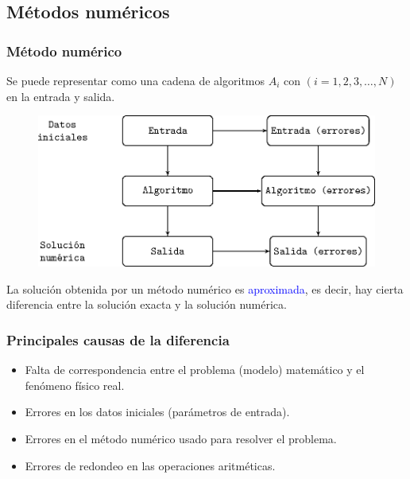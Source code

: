 \subsection{Métodos numéricos}
\begin{frame}
\frametitle{Método numérico}
Se puede representar como una cadena de algoritmos $A_{i}$ con $(i = 1, 2, 3, \ldots , N)$ en la entrada y salida.
\begin{figure}
\centering
\includegraphics[scale=1]{dibujometodonum.eps} 
\end{figure}
\end{frame}
\begin{frame}
La solución obtenida por un método numérico es \textcolor{blue}{aproximada}, es decir, hay cierta diferencia entre la solución exacta y la solución numérica.
\end{frame}
\begin{frame}
\frametitle{Principales causas de la diferencia}
\begin{itemize}[<+->]
\item Falta de correspondencia entre el problema (modelo) matemático y el fenómeno físico real.
\item Errores en los datos iniciales (parámetros de entrada).
\item Errores en el método numérico usado para resolver el problema.
\item Errores de redondeo en las operaciones aritméticas.
\end{itemize}
\end{frame}

